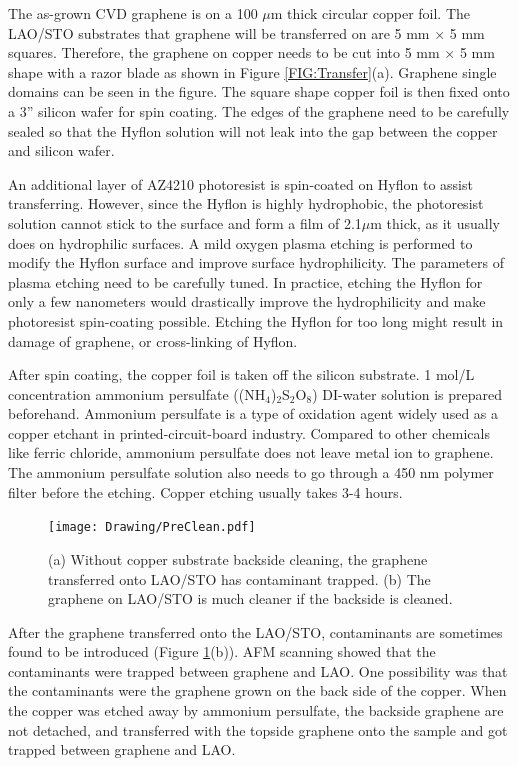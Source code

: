\documentclass[pdflatex, sectionletters, 12pt]{pittetd}    %
\begin{document}
The as-grown CVD graphene is on a 100 $\mu$m thick circular copper foil. The LAO/STO substrates that graphene will be transferred on are 5 mm $\times$ 5 mm squares. Therefore, the graphene on copper needs to be cut into 5 mm $\times$ 5 mm shape with a razor blade as shown in Figure \ref{FIG:Transfer}(a). Graphene single domains can be seen in the figure. The square shape copper foil is then fixed onto a 3'' silicon wafer for spin coating. The edges of the graphene need to be carefully sealed so that the Hyflon solution will not leak into the gap between the copper and silicon wafer.

An additional layer of AZ4210 photoresist is spin-coated on Hyflon to assist transferring. However, since the Hyflon is highly hydrophobic, the photoresist solution cannot stick to the surface and form a film of 2.1$\mu$m thick, as it usually does on hydrophilic surfaces. A mild oxygen plasma etching is performed to modify the Hyflon surface and improve surface hydrophilicity. The parameters of plasma etching need to be carefully tuned. In practice, etching the Hyflon for only a few nanometers would drastically improve the hydrophilicity and make photoresist spin-coating possible. Etching the Hyflon for too long might result in damage of graphene, or cross-linking of Hyflon.

After spin coating, the copper foil is taken off the silicon substrate. 1 mol/L concentration ammonium persulfate ((NH$_4$)$_2$S$_2$O$_8$) DI-water solution is prepared beforehand. Ammonium persulfate is a type of oxidation agent widely used as a copper etchant in printed-circuit-board industry. Compared to other chemicals like ferric chloride, ammonium persulfate does not leave metal ion to graphene. The ammonium persulfate solution also needs to go through a 450 nm polymer filter before the etching. Copper etching usually takes 3-4 hours. 

\begin{figure}[h!]
	\centering
	\texttt{[image: Drawing/PreClean.pdf]}
	\caption{(a) Without copper substrate backside cleaning, the graphene transferred onto LAO/STO has contaminant trapped. (b) The graphene on LAO/STO is much cleaner if the backside is cleaned.}
	\label{FIG:PreClean}
\end{figure}

After the graphene transferred onto the LAO/STO, contaminants are sometimes found to be introduced (Figure \ref{FIG:PreClean}(b)). AFM scanning showed that the contaminants were trapped between graphene and LAO. One possibility was that the contaminants were the graphene grown on the back side of the copper. When the copper was etched away by ammonium persulfate, the backside graphene are not detached, and transferred with the topside graphene onto the sample and got trapped between graphene and LAO. 
\end{document}
